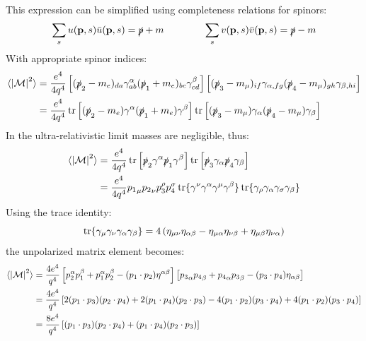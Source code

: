 This expression can be simplified using completeness relations for spinors:
\begin{equation}
  \sum_s u(\mathbf{p},s) \bar{u}(\mathbf{p},s) = \slashed{p} + m
  \qquad \qquad
  \sum_s v(\mathbf{p},s) \bar{v}(\mathbf{p},s) = \slashed{p} - m
\end{equation}
With appropriate spinor indices:
\begin{equation*}
  \begin{split}
    \braket{\left\lvert\mathcal{M}\right\rvert^2}
    & = \frac{e^4}{4q^4} \left[ (\slashed{p}_2 - m_e)_{da} \gamma^\alpha_{ab} (\slashed{p}_1 + m_e)_{bc} \gamma^\beta_{cd} \right] \left[ (\slashed{p}_3 - m_\mu)_{if} \gamma_{\alpha,fg} (\slashed{p}_4 - m_\mu)_{gh} \gamma_{\beta,hi} \right] \\
    & = \frac{e^4}{4q^4} \operatorname{tr} \left[ (\slashed{p}_2 - m_e) \gamma^\alpha (\slashed{p}_1 + m_e) \gamma^\beta \right] \operatorname{tr} \left[ (\slashed{p}_3 - m_\mu) \gamma_{\alpha} (\slashed{p}_4 - m_\mu) \gamma_{\beta} \right]
  \end{split}
\end{equation*}
In the ultra-relativistic limit masses are negligible, thus:
\begin{equation*}
  \begin{split}
    \braket{\left\lvert\mathcal{M}\right\rvert^2}
    & = \frac{e^4}{4q^4} \operatorname{tr} \left[ \slashed{p}_2 \gamma^\alpha \slashed{p}_1 \gamma^\beta \right] \operatorname{tr} \left[ \slashed{p}_3 \gamma_{\alpha} \slashed{p}_4 \gamma_{\beta} \right] \\
    & = \frac{e^4}{4q^4} {p_1}_\mu {p_2}_\nu p_3^\rho p_4^\sigma \operatorname{tr} \{ \gamma^\nu \gamma^\alpha \gamma^\mu \gamma^\beta \} \operatorname{tr} \{ \gamma_\rho \gamma_\alpha \gamma_\sigma \gamma_\beta \} \\
  \end{split}
\end{equation*}
Using the trace identity:
\begin{equation}
  \operatorname{tr} \{ \gamma_\mu \gamma_\nu \gamma_\alpha \gamma_\beta \} = 4 \left( \eta_{\mu \nu} \eta_{\alpha \beta} - \eta_{\mu \alpha} \eta_{\nu \beta} + \eta_{\mu \beta} \eta_{\nu \alpha} \right)
\end{equation}
the unpolarized matrix element becomes:
\begin{equation*}
  \begin{split}
    \braket{\left\lvert\mathcal{M}\right\rvert^2}
    & = \frac{4e^4}{q^4} \left[ p_2^\alpha p_1^\beta + p_1^\alpha p_2^\beta - (p_1 \cdot p_2) \eta^{\alpha \beta} \right] \left[ {p_3}_\alpha {p_4}_\beta + {p_4}_\alpha {p_3}_\beta - (p_3 \cdot p_4) \eta_{\alpha \beta} \right] \\
    & = \frac{4e^4}{q^4} \left[ 2 (p_1 \cdot p_3) (p_2 \cdot p_4) + 2 (p_1 \cdot p_4) (p_2 \cdot p_3) - 4 (p_1 \cdot p_2) (p_3 \cdot p_4) + 4 (p_1 \cdot p_2) (p_3 \cdot p_4) \right] \\
    & = \frac{8e^4}{q^4} \left[ (p_1 \cdot p_3) (p_2 \cdot p_4) + (p_1 \cdot p_4) (p_2 \cdot p_3) \right]
  \end{split}
\end{equation*}
